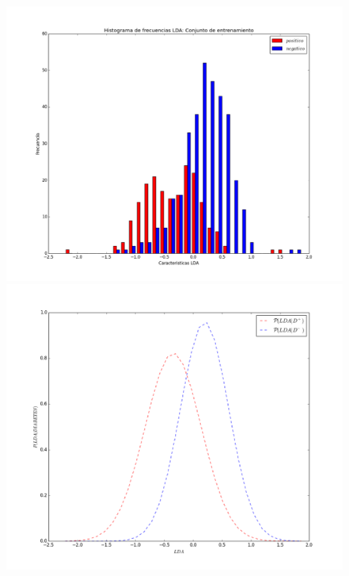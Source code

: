 \documentclass[letter, titlepage, 10pt]{article}
\begin{document}
\begin{appendices}
  \begin{figure}[H]
  \centering
    \begin{minipage}{.5\textwidth}
        \centering
        \includegraphics[width=1\linewidth]{images/Histograma_D5}
    \end{minipage}%
    \begin{minipage}{.5\textwidth}
        \centering
        \includegraphics[width=1\linewidth]{images/PDF_D5}
    \end{minipage}
\end{figure}


\end{appendices}
\end{document}
